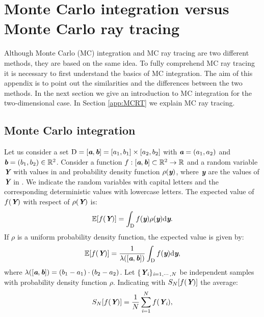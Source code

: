 \chapter{Monte Carlo integration versus Monte Carlo ray tracing}\label{chap:appraytracing}
Although Monte Carlo (MC)	 integration and MC ray tracing are two different methods, they are based on the same idea. To fully comprehend MC ray tracing it is necessary to first understand the basics of MC integration. The aim of this appendix is to point out the similarities and the differences between the two methods. In the next section we give an introduction to MC integration for the two-dimensional case. In Section \ref{app:MCRT} we explain MC ray tracing.
\section{Monte Carlo integration}
Let us consider a set $\mbox{$\textup{D}$} = [\textit{\textbf{a}}, \textit{\textbf{b}}]= [a_1, b_1] \times [a_2, b_2]$ with $\textit{\textbf{a}} = (a_1, a_2)$ and $\textit{\textbf{b}} = (b_1, b_2)\in\mathbb{R}^2$. Consider a function $f:[\textit{\textbf{a}},\textit{\textbf{b}}]\subset \mathbb{R}^2 \rightarrow \mathbb{R}$ and a random variable $\textit{\textbf{Y}}$ with values in  and probability density function $\rho(\textit{\textbf{y}})$, where $\textit{\textbf{y}}$ are the values of $\textit{\textbf{Y}}$ in . We indicate the random variables with capital letters and the corresponding deterministic values with lowercase letters. The expected value of $f(\textit{\textbf{Y}})$ with respect of $\rho(\textit{\textbf{Y}})$ is:
\begin{equation}
\mathbb{E}[f(\textit{\textbf{Y}})] =\int_{\textup{D}}f(\textit{\textbf{y}})\rho(\textit{\textbf{y}}) \textrm{d}\textit{\textbf{y}}.
\end{equation}
If $\rho$ is a uniform probability density function, the expected value is given by:
\begin{equation}\label{eq:expected_value}
\mathbb{E}[f(\textit{\textbf{Y}})] =\frac{1}{\lambda([\textit{\textbf{a}},\textit{\textbf{b}}])} \int_{\textup{D}}f(\textit{\textbf{y}}) \textrm{d}\textit{\textbf{y}},
\end{equation}
where $\lambda([\textit{\textbf{a}},\textit{\textbf{b}}]) = (b_1-a_1)\cdot(b_2-a_2)$.
Let $\{\textit{\textbf{Y}}_{\textit{i}}\}_{\textit{i} = 1, \cdots, N}$ be independent samples with probability density function $\rho$.
Indicating with $S_{N}[f(\textit{\textbf{Y}})]$ the average: 
\begin{equation}
S_{N}[f(\textit{\textbf{Y}})] = \frac{1}{N} \sum_{\textit{i}=1}^{N} f(\textit{\textbf{Y}}_{\textit{i}}),
\end{equation}
